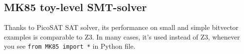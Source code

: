 \subsection{MK85 toy-level SMT-solver}

\renewcommand{\CURPATH}{solvers/MK85}

Thanks to PicoSAT SAT solver, its performance on small and simple bitvector examples is comparable to Z3.
In many cases, it's used instead of Z3, whenever you see \texttt{from MK85 import *} in Python file.





